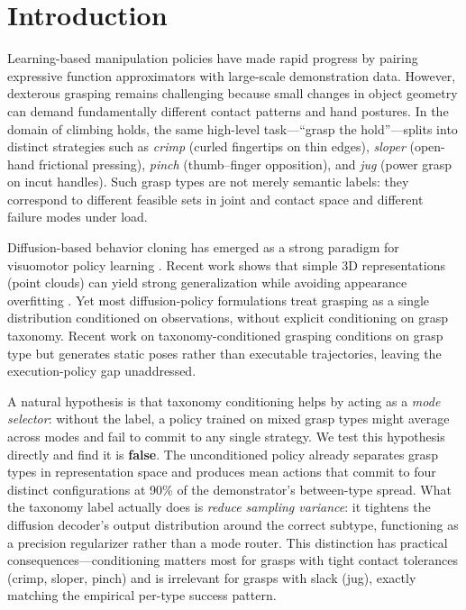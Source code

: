 \documentclass[11pt]{article}
\begin{document}
\section{Introduction}
Learning-based manipulation policies have made rapid progress by pairing expressive
function approximators with large-scale demonstration data. However, dexterous grasping
remains challenging because small changes in object geometry can demand fundamentally
different contact patterns and hand postures. In the domain of climbing holds, the same
high-level task---``grasp the hold''---splits into distinct strategies such as
\emph{crimp} (curled fingertips on thin edges), \emph{sloper} (open-hand frictional
pressing), \emph{pinch} (thumb--finger opposition), and \emph{jug} (power grasp on
incut handles). Such grasp types are not merely semantic labels: they correspond to
different feasible sets in joint and contact space and different failure modes under load.

Diffusion-based behavior cloning has emerged as a strong paradigm for visuomotor policy
learning \citep{chi2023diffusionpolicy,ho2020ddpm}. Recent work shows that simple 3D
representations (point clouds) can yield strong generalization while avoiding appearance
overfitting \citep{ze2024dp3,ze2024idp3}. Yet most diffusion-policy formulations treat
grasping as a single distribution conditioned on observations, without explicit
conditioning on grasp taxonomy. Recent work on taxonomy-conditioned grasping
\citep{dexonomy2025,tian2024graspasyousay} conditions on grasp type but generates
static poses rather than executable trajectories, leaving the execution-policy gap
unaddressed.

A natural hypothesis is that taxonomy conditioning helps by acting as a \emph{mode
selector}: without the label, a policy trained on mixed grasp types might average
across modes and fail to commit to any single strategy. We test this hypothesis
directly and find it is \textbf{false}. The unconditioned policy already separates
grasp types in representation space and produces mean actions that commit to four
distinct configurations at 90\% of the demonstrator's between-type spread. What the
taxonomy label actually does is \emph{reduce sampling variance}: it tightens the
diffusion decoder's output distribution around the correct subtype, functioning as a
precision regularizer rather than a mode router. This distinction has practical
consequences---conditioning matters most for grasps with tight contact tolerances
(crimp, sloper, pinch) and is irrelevant for grasps with slack (jug), exactly matching
the empirical per-type success pattern.
\end{document}
